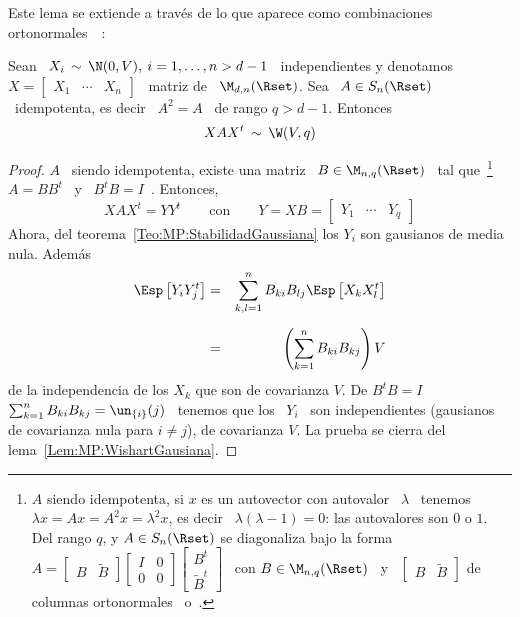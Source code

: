 Este  lema  se  extiende  a  trav\'es  de  lo  que  aparece  como  combinaciones
ortonormales~~\cite{Mui82, GupNad99, BilBre99, And03, Seb04, KotNad04}:
%
\begin{lema}\label{Lem:MP:WishartGausianaIdempotenta}
%
  Sean \ $X_i \, \sim \, \N(0,V), \: i = 1, \ldots , n > d-1$ \ independientes y
  denotamos \ $X = \begin{bmatrix} X_1 & \cdots & X_n \end{bmatrix}$ \ matriz de
  \ $\M_{d,n}(\Rset)$. Sea  \ $A \in S_n(\Rset)$ \  idempotenta, es decir \
  $A^2 = A$ \ de rango $q > d-1$. Entonces
  \[
  X A X^t \,\sim \, \W(V,q)
  \]
\end{lema}
%
\begin{proof}
  $A$ \  siendo idempotenta, existe una  matriz \ $B \in  \M_{n,q}(\Rset)$ \ tal
  que~\footnote{$A$ siendo idempotenta, si $x$  es un autovector con autovalor \
    $\lambda$ \ tenemos  \ $\lambda x = A x  = A^2 x = \lambda^2  x$, es decir \
    $\lambda (\lambda-1) = 0$: las autovalores  son $0$ o $1$.  Del rango $q$, y
    $A \in S_n(\Rset)$  se diagonaliza bajo la forma \ $A  = \begin{bmatrix} B &
      \widetilde{B}   \end{bmatrix}    \begin{bmatrix}   I   &   0    \\   0   &
      0 \end{bmatrix} \begin{bmatrix} B^t\\ \widetilde{B}^t \end{bmatrix}$ \ con
    $B    \in     \M_{n,q}(\Rset)$    \    y    \     $\begin{bmatrix}    B    &
      \widetilde{B}             \end{bmatrix}$            de            columnas
    ortonormales~\cite[Teo.~21.5.7]{Har08} o~\cite{HorJoh13}.}  \  $A = B B^t$ \
  y \ $B^t B = I$~\cite{Har08}. Entonces,
  \[
  X A  X^t =  Y Y^t \qquad  \mbox{con} \qquad Y  = X  B = \begin{bmatrix}  Y_1 &
    \cdots & Y_q \end{bmatrix}
  \]
  Ahora,    del   teorema~\ref{Teo:MP:StabilidadGaussiana}    los    $Y_i$   son
  gausianos de media nula. Adem\'as
  \begin{eqnarray*}
  \Esp\left[ Y_i Y_j^t \right] & = & \sum_{k,l=1}^n B_{ki} B_{lj} \Esp\left[ X_k
  X_l^t \right]\\[2mm]
  & = & \left( \sum_{k=1}^n B_{ki} B_{kj} \right) V
  \end{eqnarray*}
  de la independencia de los $X_k$ que son de covarianza $V$. De $B^t B = I$ \ie
  \ $\sum_{k=1}^n  B_{ki} B_{kj} = \un_{\{i\}}(j)$  \ tenemos que los  \ $Y_i$ \
  son  independientes  (gausianos  de  covarianza  nula  para  $i  \ne  j$),  de
  covarianza $V$.  La prueba se cierra del lema~\ref{Lem:MP:WishartGausiana}.
\end{proof}
